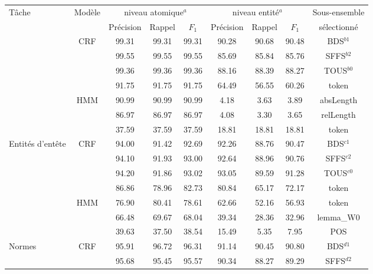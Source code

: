 \begin{table}[!htb]
\scriptsize
\begin{center}
\begin{tabular}{p{1cm}|c|ccc|ccc|c}
\hline\noalign{\smallskip}
Tâche & Modèle & \multicolumn{3}{c}{niveau atomique$^a$} & \multicolumn{3}{c}{niveau entité$^a$}& Sous-ensemble \\
 & & Précision & Rappel & $F_1$ &  Précision & Rappel & $F_1$ & sélectionné\\
\noalign{\smallskip}\hline\noalign{\smallskip}
\multirow{7}{*}{Sections} 		& \multirow{4}{*}{CRF} & 99.31 & 99.31 & 99.31 & 90.28 & 90.68 & 90.48 & BDS$^{b1}$  \\
  				&  & 99.55 & 99.55 & {99.55} & 85.69 & 85.84 & 85.76 & {SFFS}$^{b2}$ \\
                &  & 99.36 & 99.36 & 99.36 & 88.16 & 88.39 & 88.27 & TOUS$^{b0}$ \\
                &  & 91.75 & 91.75 & 91.75 & 64.49 & 56.55 & 60.26 & token \\  \cline{2-9}
                 & \multirow{3}{*}{HMM} & 90.99 & 90.99 & {90.99}  & 4.18 & 3.63 & 3.89 & {absLength} \\ 
 & & 86.97 & 86.97 & 86.97 & 4.08 & 3.30 & 3.65 & relLength \\   
  &  & 37.59 & 37.59 & 37.59  & 18.81 & 18.81 & 18.81 & token \\ \hline
\multirow{7}{0.9cm}{Entités d'entête}	& \multirow{4}{*}{CRF} & 94.00 & 91.42 & 92.69 & 92.26 & 88.76 & 90.47 & BDS$^{c1}$  \\
				&  & 94.10 & 91.93 & {93.00} & 92.64 & 88.96 & 90.76 & {SFFS}$^{c2}$  \\ 
                &  & 94.20 & 91.86 & 93.02 & 93.05 & 89.59 & 91.28 & TOUS$^{c0}$ \\
                &  & 86.86 & 78.96 & 82.73 & 80.84 & 65.17 & 72.17 & token \\ \cline{2-9}
                  &  \multirow{3}{*}{HMM}  & 76.90 & 80.41 & {78.61} & 62.66 & 52.16 & 56.93 &  {token} \\ 
  &    & 66.48 & 69.67 & 68.04 & 39.34 & 28.36 & 32.96 &  lemma\_W0 \\ 
  &    & 39.63 & 37.50 & 38.54 & 15.49 & 5.35 & 7.95 &  POS \\ \hline
\multirow{6}{*}{Normes} 			& \multirow{4}{*}{CRF} & 95.91 & 96.72 & 96.31 & 91.14 & 90.45 & 90.80 & {BDS}$^{d1}$ \\ 
				&  & 95.68 & 95.45 & 95.57 & 90.34 & 88.27 & 89.29 & SFFS$^{d2}$ \\ 

\end{tabular}
\end{center}
\end{table}
